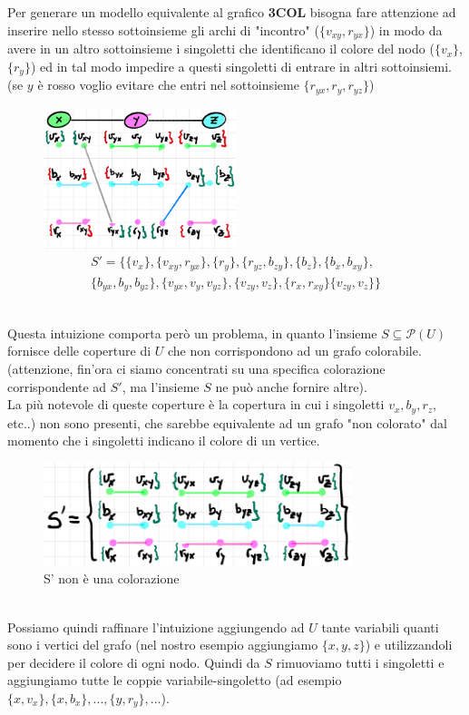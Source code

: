 \documentclass[a4paper]{article}
\begin{document}
Per generare un modello equivalente al grafico \textbf{3COL} bisogna fare attenzione ad inserire nello stesso sottoinsieme gli archi di "incontro" ($\{v_{xy},r_{yx}\}$) in modo da avere in un altro sottoinsieme i singoletti che identificano il colore del nodo ($\{v_x\}$,$\{r_y\}$) ed in tal modo impedire a questi singoletti di entrare in altri sottoinsiemi. (se $y$ è rosso voglio evitare che entri nel sottoinsieme $\{r_{yx},r_y,r_{yz}\}$)
\begin{figure}[!ht]
                \centering
                \includegraphics[width = 0.5\textwidth]{./img/E11_colorazione.png}
		\begin{align*} 
			S'=\{\{v_x\},\{v_{xy}, r_{yx}\},\{r_y\}, \{ r_{yz}, b_{zy} \}, \{b_z\}, \{b_x, b_{xy} \}, \\
			\{b_{yx}, b_y, b_{yz} \}, \{v_{yx}, v_y, v_{yz} \}, \{v_{zy},v_z \},\{r_x, r_{xy} \}  \{v_{zy},v_z \}\}
		\end{align*}
\end{figure}\\
Questa intuizione comporta però un problema, in quanto l'insieme $S \subseteq \mathcal{P}(U)$ fornisce delle coperture di $U$ che non corrispondono ad un grafo colorabile.
(attenzione, fin'ora ci siamo concentrati su una specifica colorazione corrispondente ad $S'$, ma l'insieme $S$ ne può anche fornire altre).\\
La più notevole di queste coperture è la copertura in cui i singoletti $v_x,b_y,r_z$, etc..) non sono presenti, che sarebbe equivalente ad un grafo "non colorato" dal momento che i singoletti indicano il colore di un vertice.\\
\begin{figure}[!ht]
                \centering
                \includegraphics[width = 0.8\textwidth]{./img/E11_degenere.png}
                \caption{S' non è una colorazione} \label{FIG:E11_degenere}
\end{figure}\\
Possiamo quindi raffinare l'intuizione aggiungendo ad $U$ tante variabili quanti sono i vertici del grafo (nel nostro esempio aggiungiamo $\{x,y,z\}$) e utilizzandoli per decidere il colore di ogni nodo.
Quindi da $S$ rimuoviamo tutti i singoletti e aggiungiamo tutte le coppie variabile-singoletto (ad esempio $\{x,v_x\},\{x, b_x\},...,\{y,r_y\},...$).
\end{document}
